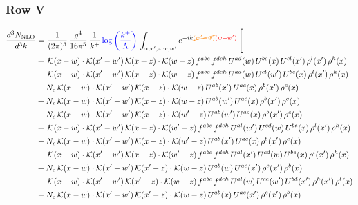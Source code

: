 \documentclass[9pt]{article}
\numberwithin{equation}{section}
\begin{document}
\subsubsection{Row V}
\begin{align}
\frac{d^{3}N_{\mathrm{NLO}}}{d^{3}k} & = \frac{1}{(2\pi)^{3}}\,\frac{g^{4}}{16\pi^{5}}\,\frac{1}{k^{+}}\,{\color{blue}\log{\left(\frac{k^{+}}{\Lambda}\right)}}\,\int_{x,x',z,w,w'}e^{-ik{\color{orange}\cancel{(w'-w)}}{\color{red}(w-w')}}\,\Bigg[\notag\\ &  +\,\mathcal{K}(x-w)\cdot\mathcal{K}(x'-w')\,\mathcal{K}(x-z)\cdot\mathcal{K}(w-z)\,f^{abc}\,f^{deh}\,U^{ad}(w)\,U^{be}(x)\,U^{cl}(x')\,\rho^{l}(x')\,\rho^{h}(x)\notag\\
& -\,\mathcal{K}(x-w)\cdot\mathcal{K}(x'-w')\,\mathcal{K}(x-z)\cdot\mathcal{K}(w-z)\,f^{abc}\,f^{deh}\,U^{ad}(w)\,U^{cl}(w')\,U^{be}(x)\,\rho^{l}(x')\,\rho^{h}(x)\notag\\
& -N_{c}\,\mathcal{K}(x-w)\cdot\mathcal{K}(x'-w')\,\mathcal{K}(x-z)\cdot\mathcal{K}(w-z)\,U^{ab}(x')\,U^{ac}(x)\,\rho^{b}(x')\,\rho^{c}(x)\notag\\
& +N_{c}\,\mathcal{K}(x-w)\cdot\mathcal{K}(x'-w')\,\mathcal{K}(x-z)\cdot\mathcal{K}(w-z)\,U^{ab}(w')\,U^{ac}(x)\,\rho^{b}(x')\,\rho^{c}(x)\notag\\
& +N_{c}\,\mathcal{K}(x-w)\cdot\mathcal{K}(x'-w')\,\mathcal{K}(x-z)\cdot\mathcal{K}(w'-z)\,U^{ab}(w')\,U^{ac}(x)\,\rho^{b}(x')\,\rho^{c}(x)\notag\\
& +\,\mathcal{K}(x-w)\cdot\mathcal{K}(x'-w')\,\mathcal{K}(x-z)\cdot\mathcal{K}(w'-z)\,f^{abc}\,f^{deh}\,U^{al}(w')\,U^{cd}(w)\,U^{be}(x)\,\rho^{l}(x')\,\rho^{h}(x)\notag\\
& -N_{c}\,\mathcal{K}(x-w)\cdot\mathcal{K}(x'-w')\,\mathcal{K}(x-z)\cdot\mathcal{K}(w'-z)\,U^{ab}(x')\,U^{ac}(x)\,\rho^{b}(x')\,\rho^{c}(x)\notag\\
& -\,\mathcal{K}(x-w)\cdot\mathcal{K}(x'-w')\,\mathcal{K}(x-z)\cdot\mathcal{K}(w'-z)\,f^{abc}\,f^{deh}\,U^{al}(x')\,U^{cd}(w)\,U^{be}(x)\,\rho^{l}(x')\,\rho^{h}(x)\notag\\
& +N_{c}\,\mathcal{K}(x-w)\cdot\mathcal{K}(x'-w')\,\mathcal{K}(x'-z)\cdot\mathcal{K}(w-z)\,U^{ab}(w)\,U^{ac}(x')\,\rho^{c}(x')\,\rho^{b}(x)\notag\\
& -\,\mathcal{K}(x-w)\cdot\mathcal{K}(x'-w')\,\mathcal{K}(x'-z)\cdot\mathcal{K}(w-z)\,f^{abc}\,f^{deh}\,U^{al}(w)\,U^{ce}(w')\,U^{bd}(x')\,\rho^{h}(x')\,\rho^{l}(x)\notag\\
& -N_{c}\,\mathcal{K}(x-w)\cdot\mathcal{K}(x'-w')\,\mathcal{K}(x'-z)\cdot\mathcal{K}(w-z)\,U^{ab}(x)\,U^{ac}(x')\,\rho^{c}(x')\,\rho^{b}(x)\notag\\

\end{align}
\end{document}
